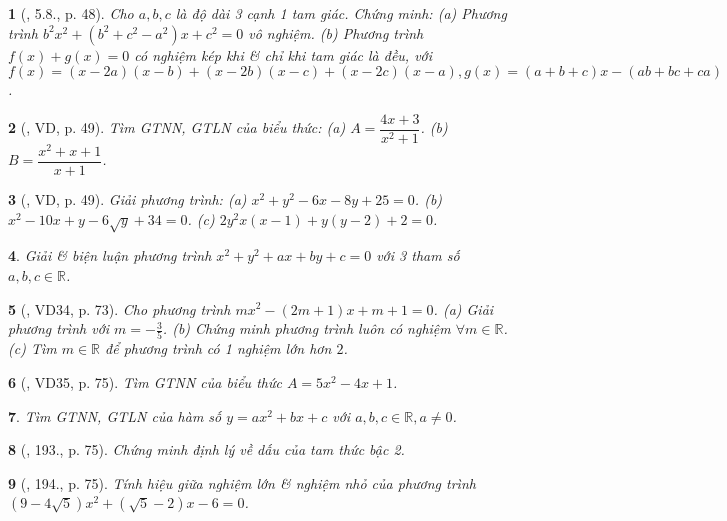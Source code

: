 \documentclass{article}
\newtheorem{baitoan}{}
\begin{document}
\begin{baitoan}[\cite{Binh_boi_duong_Toan_9_tap_2}, 5.8., p. 48]
	Cho $a,b,c$ là độ dài 3 cạnh 1 tam giác. Chứng minh: (a) Phương trình $b^2x^2 + (b^2 + c^2 - a^2)x + c^2 = 0$ vô nghiệm. (b) Phương trình $f(x) + g(x) = 0$ có nghiệm kép khi \& chỉ khi tam giác là đều, với $f(x) = (x - 2a)(x - b) + (x - 2b)(x - c) + (x - 2c)(x - a),g(x) = (a + b + c)x - (ab + bc + ca)$.
\end{baitoan}

\begin{baitoan}[\cite{Binh_boi_duong_Toan_9_tap_2}, VD, p. 49]
	Tìm {\rm GTNN, GTLN} của biểu thức: (a) $A = \dfrac{4x + 3}{x^2 + 1}$. (b) $B = \dfrac{x^2 + x + 1}{x + 1}$.
\end{baitoan}

\begin{baitoan}[\cite{Binh_boi_duong_Toan_9_tap_2}, VD, p. 49]
	Giải phương trình: (a) $x^2 + y^2 - 6x - 8y + 25 = 0$. (b) $x^2 - 10x + y - 6\sqrt{y} + 34 = 0$. (c) $2y^2x(x - 1) + y(y - 2) + 2 = 0$.
\end{baitoan}

\begin{baitoan}
	Giải \& biện luận phương trình $x^2 + y^2 + ax + by + c = 0$ với 3 tham số $a,b,c\in\mathbb{R}$.
\end{baitoan}

\begin{baitoan}[\cite{Tuyen_Toan_9_old}, VD34, p. 73]
	Cho phương trình $mx^2 - (2m + 1)x + m + 1 = 0$. (a) Giải phương trình với $m = -\frac{3}{5}$. (b) Chứng minh phương trình luôn có nghiệm $\forall m\in\mathbb{R}$. (c) Tìm $m\in\mathbb{R}$ để phương trình có 1 nghiệm lớn hơn $2$.
\end{baitoan}

\begin{baitoan}[\cite{Tuyen_Toan_9_old}, VD35, p. 75]
	Tìm {\rm GTNN} của biểu thức $A = 5x^2 - 4x + 1$.
\end{baitoan}

\begin{baitoan}
	Tìm {\rm GTNN, GTLN} của hàm số $y = ax^2 + bx + c$ với $a,b,c\in\mathbb{R},a\ne0$.
\end{baitoan}

\begin{baitoan}[\cite{Tuyen_Toan_9_old}, 193., p. 75]
	Chứng minh định lý về dấu của tam thức bậc 2.
\end{baitoan}

\begin{baitoan}[\cite{Tuyen_Toan_9_old}, 194., p. 75]
	Tính hiệu giữa nghiệm lớn \& nghiệm nhỏ của phương trình $(9 - 4\sqrt{5})x^2 + (\sqrt{5} - 2)x - 6 = 0$.
\end{baitoan}
\end{document}
